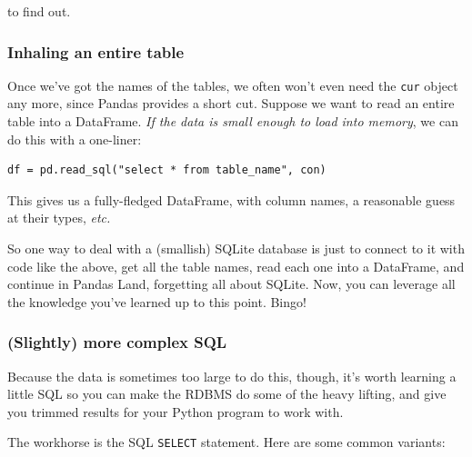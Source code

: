 \documentclass[12pt]{article}
\begin{document}
to find out.

\subsubsection{Inhaling an entire table}

Once we've got the names of the tables, we often won't even need the
\texttt{cur} object any more, since Pandas provides a short cut. Suppose we
want to read an entire table into a DataFrame. \textit{If the data is small
enough to load into memory}, we can do this with a one-liner:

\begin{Verbatim}[fontsize=\small,samepage=true,frame=none]
df = pd.read_sql("select * from table_name", con)
\end{Verbatim}

This gives us a fully-fledged DataFrame, with column names, a reasonable guess
at their types, \textit{etc.} 

So one way to deal with a (smallish) SQLite database is just to connect to it
with code like the above, get all the table names, read each one into a
DataFrame, and continue in Pandas Land, forgetting all about SQLite. Now, you
can leverage all the knowledge you've learned up to this point. Bingo!

\subsubsection{(Slightly) more complex SQL}

Because the data is sometimes too large to do this, though, it's worth
learning a little SQL so you can make the RDBMS do some of the heavy lifting,
and give you trimmed results for your Python program to work with.

The workhorse is the SQL \texttt{SELECT} statement. Here are some common
variants:
\end{document}
